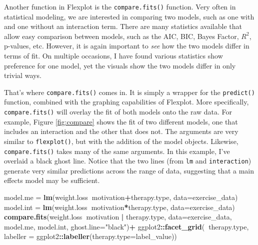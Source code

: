 \documentclass[,]{book}
\newenvironment{Shaded}{\begin{snugshade}}{\end{snugshade}}
\newcommand{\KeywordTok}[1]{\textcolor[rgb]{0.13,0.29,0.53}{\textbf{#1}}}
\newcommand{\DataTypeTok}[1]{\textcolor[rgb]{0.13,0.29,0.53}{#1}}
\newcommand{\StringTok}[1]{\textcolor[rgb]{0.31,0.60,0.02}{#1}}
\newcommand{\OperatorTok}[1]{\textcolor[rgb]{0.81,0.36,0.00}{\textbf{#1}}}
\newcommand{\NormalTok}[1]{#1}
\begin{document}
Another function in Flexplot is the \texttt{compare.fits()} function.
Very often in statistical modeling, we are interested in comparing two
models, such as one with and one without an interaction term. There are
many statistics available that allow easy comparison between models,
such as the AIC, BIC, Bayes Factor, \(R^2\), p-values, etc. However, it
is again important to \emph{see} how the two models differ in terms of
fit. On multiple occasions, I have found various statistics show
preference for one model, yet the visuals show the two models differ in
only trivial ways.

That's where \texttt{compare.fits()} comes in. It is simply a wrapper
for the \texttt{predict()} function, combined with the graphing
capabilities of Flexplot. More specifically, \texttt{compare.fits()}
will overlay the fit of both models onto the raw data. For example,
Figure \ref{fig:compare} shows the fit of two different models, one that
includes an interaction and the other that does not. The arguments are
very similar to \texttt{flexplot()}, but with the addition of the model
objects. Likewise, \texttt{compare.fits()} takes many of the same
arguments. In this example, I've overlaid a black ghost line. Notice
that the two lines (from \texttt{lm} and \texttt{interaction}) generate
very similar predictions across the range of data, suggesting that a
main effects model may be sufficient.

\begin{Shaded}
\begin{Highlighting}[]
\NormalTok{model.me =}\StringTok{ }\KeywordTok{lm}\NormalTok{(weight.loss}\OperatorTok{~}\NormalTok{motivation}\OperatorTok{+}\NormalTok{therapy.type, }\DataTypeTok{data=}\NormalTok{exercise_data)}
\NormalTok{model.int =}\StringTok{ }\KeywordTok{lm}\NormalTok{(weight.loss}\OperatorTok{~}\NormalTok{motivation}\OperatorTok{*}\NormalTok{therapy.type, }\DataTypeTok{data=}\NormalTok{exercise_data)}
\KeywordTok{compare.fits}\NormalTok{(weight.loss}\OperatorTok{~}\NormalTok{motivation }\OperatorTok{|}\StringTok{ }\NormalTok{therapy.type, }
             \DataTypeTok{data=}\NormalTok{exercise_data, model.me, model.int, }\DataTypeTok{ghost.line=}\StringTok{"black"}\NormalTok{)}\OperatorTok{+}
\StringTok{      }\NormalTok{ggplot2}\OperatorTok{::}\KeywordTok{facet_grid}\NormalTok{(}\OperatorTok{~}\NormalTok{therapy.type, }
                          \DataTypeTok{labeller =}\NormalTok{ ggplot2}\OperatorTok{::}\KeywordTok{labeller}\NormalTok{(}\DataTypeTok{therapy.type=}\NormalTok{label_value))}
\end{Highlighting}
\end{Shaded}
\end{document}
